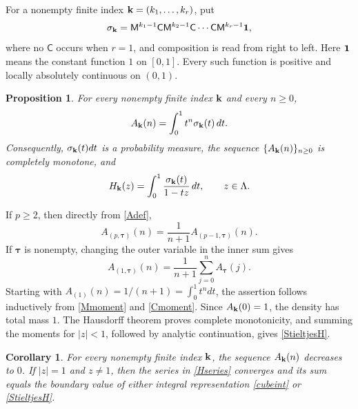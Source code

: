 \documentclass[12pt,a4paper]{amsart}
\makeatletter
\numberwithin{equation}{section}
\renewenvironment{proof}[1][Proof]{%
  \par\pushQED{\qed}%
  \normalfont\topsep6\p@\@plus6\p@\relax
  \trivlist
  \item[\hskip\labelsep\bfseries #1:]\ignorespaces
}{%
  \popQED\endtrivlist\@endpefalse
}
\theoremstyle{plain}
\newtheorem{prop}[Thm]{Proposition}
\newtheorem{Cor}[Thm]{Corollary}
\theoremstyle{definition}
\makeatother
\begin{document}
For a nonempty finite index ${\bf k}=(k_1,\ldots,k_r)$, put
\begin{equation}\label{sigmadef}
\sigma_{\bf k}
=\mathsf{M}^{k_1-1}\mathsf{C}\mathsf{M}^{k_2-1}\mathsf{C}\cdots
\mathsf{C}\mathsf{M}^{k_r-1}{\bf 1},
\end{equation}
where no $\mathsf{C}$ occurs when $r=1$, and composition is read from right to left. Here ${\bf 1}$ means the constant function $1$ on $[0,1]$. Every such function is positive and locally absolutely continuous on $(0,1)$.

\begin{prop}\label{momentdensity}
For every nonempty finite index ${\bf k}$ and every $n\geq 0$,
\begin{equation}\label{momentrepresentation}
A_{\bf k}(n)=\int_0^1t^n\sigma_{\bf k}(t)\,dt.
\end{equation}
Consequently, $\sigma_{\bf k}(t)dt$ is a probability measure, the sequence $\{A_{\bf k}(n)\}_{n\geq 0}$ is completely monotone, and
\begin{equation}\label{StieltjesH}
H_{\bf k}(z)=\int_0^1\frac{\sigma_{\bf k}(t)}{1-tz}\,dt,
\qquad z\in\Lambda.
\end{equation}
\end{prop}

\begin{proof}
If $p\geq 2$, then directly from \eqref{Adef},
\begin{equation}\label{ArecM}
A_{(p,{\boldsymbol\tau})}(n)
=\frac1{n+1}A_{(p-1,{\boldsymbol\tau})}(n).
\end{equation}
If ${\boldsymbol\tau}$ is nonempty, changing the outer variable in the inner sum gives
\begin{equation}\label{ArecC}
A_{(1,{\boldsymbol\tau})}(n)
=\frac1{n+1}\sum_{j=0}^{n}A_{\boldsymbol\tau}(j).
\end{equation}
Starting with $A_{(1)}(n)=1/(n+1)=\int_0^1t^n dt$, the assertion follows inductively from \eqref{Mmoment} and \eqref{Cmoment}.  Since $A_{\bf k}(0)=1$, the density has total mass $1$.  The Hausdorff theorem proves complete monotonicity, and summing the moments for $|z|<1$, followed by analytic continuation, gives \eqref{StieltjesH}.
\end{proof}

\begin{Cor}\label{boundaryvalues}
For every nonempty finite index ${\bf k}$, the sequence $A_{\bf k}(n)$ decreases to $0$.  If $|z|=1$ and $z\neq1$, then the series in \eqref{Hseries} converges and its sum equals the boundary value of either integral representation \eqref{cubeint} or \eqref{StieltjesH}.
\end{Cor}
\end{document}
